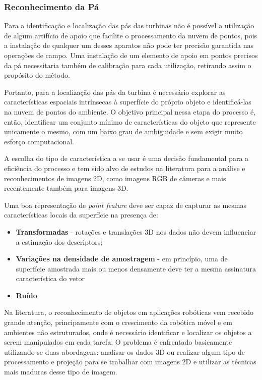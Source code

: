 \subsubsection{Reconhecimento da Pá} 

Para a identificação e localização das pás das turbinas não é possível a
utilização de algum artifício de apoio que facilite o processamento da nuvem de
pontos, pois a instalação de qualquer um desses aparatos não pode ter precisão
garantida nas operações de campo. Uma instalação de um elemento de apoio em
pontos precisos da pá necessitaria também de calibração para cada utilização, retirando assim
o propósito do método. 

Portanto, para a localização das pás da turbina é
necessário explorar as características espaciais intrínsecas à superfície do
próprio objeto e identificá-las na nuvem de pontos do ambiente. O objetivo
principal nessa etapa do processo é, então, identificar um conjunto mínimo de
características do objeto que represente unicamente o mesmo, com um baixo grau
de ambiguidade e sem exigir muito esforço computacional. 

A escolha do tipo de característica a se usar é uma decisão fundamental para a
eficiência do processo e tem sido alvo de estudos na literatura para a análise
e reconhecimentos de imagens 2D, como imagens RGB de câmeras e mais recentemente
também para imagens 3D. 

Uma boa representação de \textit{point feature} deve ser capaz de capturar as
mesmas características locais da superfície na presença de:

\begin{itemize}
  \item \textbf{Transformadas} -  rotações e translações 3D nos dados não devem
  influenciar a estimação dos descriptors;
  \item \textbf{Variações na densidade de amostragem} - em princípio, uma de
  superfície amostrada mais ou menos densamente deve ter a mesma assinatura característica do vetor
  \item \textbf{Ruído}
\end{itemize}

Na literatura, o reconhecimento de objetos em aplicações robóticas vem recebido
grande atenção, principamente com o crescimento da robótica móvel e em ambientes
não estruturados, onde é necessário identificar e localizar os objetos a serem
manipulados em cada tarefa. O problema é enfrentado basicamente utilizando-se
duas abordagens: analisar os dados 3D ou realizar algum tipo de processamento e
projeção para se trabalhar com imagens 2D e utilizar as técnicas mais maduras
desse tipo de imagem.

